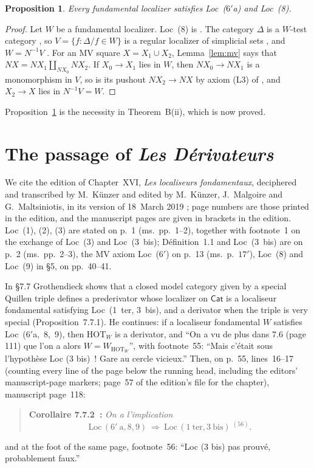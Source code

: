 \documentclass[11pt,a4paper]{article}
\newtheorem{proposition}[theorem]{Proposition}
\theoremstyle{definition}
\newcommand{\Cat}{\mathsf{Cat}}
\begin{document}
\begin{proposition}\label{prop:necessity}
Every fundamental localizer satisfies Loc~\textup{($6'$a)} and Loc~\textup{(8)}.
\end{proposition}

\begin{proof}
Let $W$ be a fundamental localizer. Loc~(8) is \cite[Cor.~4.2.22]{Cis06}. The category $\Delta$ is
a $W$-test category \cite[Ex.~4.1.21]{Cis06}, so $V=\{f:\Delta/f\in W\}$ is a regular localizer of
simplicial sets \cite[Prop.~4.2.9]{Cis06}, and $W=N^{-1}V$ \cite[Th.~4.1.26 and
Ex.~4.1.29]{Cis06}. For an MV square $X=X_1\cup X_2$, Lemma~\ref{lem:mv} says that
$NX=NX_1\amalg_{NX_0}NX_2$. If $X_0\to X_1$ lies in $W$, then $NX_0\to NX_1$ is a monomorphism in
$V$, so is its pushout $NX_2\to NX$ by axiom (L3) of \cite[D\'ef.~1.4.1]{Cis06}, and $X_2\to X$
lies in $N^{-1}V=W$.
\end{proof}

Proposition~\ref{prop:necessity} is the necessity in Theorem~B(ii), which is now proved.

\section{The passage of \emph{Les D\'erivateurs}}\label{sec:manuscript}

We cite the edition of Chapter~XVI, \emph{Les localiseurs fondamentaux}, deciphered and
transcribed by M.~K\"unzer and edited by M.~K\"unzer, J.~Malgoire and G.~Maltsiniotis, in its
version of 18~March 2019 \cite{Der}; page numbers are those printed in the edition, and the
manuscript pages are given in brackets in the edition. Loc~(1), (2), (3) are stated on p.~1
(ms.~pp.~1--2), together with footnote~1 on the exchange of Loc~(3) and Loc~(3~bis);
D\'efinition~1.1 and Loc~(3~bis) are on p.~2 (ms.~pp.~2--3), the MV axiom Loc~($6'$) on p.~13
(ms.~p.~$17'$), Loc~(8) and Loc~(9) in \S5, on pp.~40--41.

In \S7.7 Grothendieck shows that a closed model category given by a special Quillen triple
defines a prederivator whose localizer on $\Cat$ is a localiseur fondamental satisfying
Loc~(1~ter, 3~bis), and a derivator when the triple is very special (Proposition~7.7.1). He continues: if a localiseur fondamental $W$ satisfies Loc~($6'$a,~8,~9),
then $\mathrm{HOT}_W$ is a derivator, and ``On a vu de plus dans 7.6 (page 111) que l'on a alors
$W=W_{\mathrm{HOT}_W}$'', with footnote~55: ``Mais c'\'etait sous l'hypoth\`ese Loc (3 bis)~!
Gare au cercle vicieux.'' Then, on p.~55, lines~16--17 (counting every line of the page below the running head,
including the editors' manuscript-page markers; page~57 of the edition's file for the chapter),
manuscript page~118:
\begin{quote}
\textbf{Corollaire 7.7.2~:} \emph{On a l'implication}
\[
\mathrm{Loc}\,(6'\ \mathrm{a},8,9)\ \Longrightarrow\ \mathrm{Loc}\,(1\ \mathrm{ter},3\ \mathrm{bis})\ {}^{(56)}.
\]
\end{quote}
and at the foot of the same page, footnote~56: ``Loc (3 bis) pas prouv\'e, probablement faux.''
\end{document}
